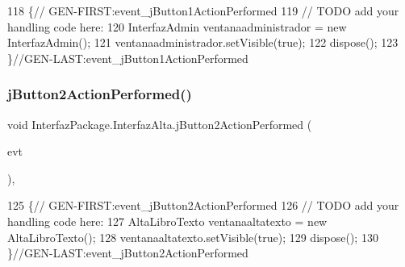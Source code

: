 \begin{DoxyCode}
118                                                                          \{\textcolor{comment}{//
      GEN-FIRST:event\_jButton1ActionPerformed}
119         \textcolor{comment}{// TODO add your handling code here:}
120         InterfazAdmin ventanaadministrador = \textcolor{keyword}{new} InterfazAdmin();
121         ventanaadministrador.setVisible(\textcolor{keyword}{true});
122         dispose();
123     \}\textcolor{comment}{//GEN-LAST:event\_jButton1ActionPerformed}
\end{DoxyCode}
\mbox{\label{class_interfaz_package_1_1_interfaz_alta_ae07fdac3530bdd87b8a2c9ca7705ea61}} 
\subsubsection{\texorpdfstring{j\+Button2\+Action\+Performed()}{jButton2ActionPerformed()}}
{\footnotesize\ttfamily void Interfaz\+Package.\+Interfaz\+Alta.\+j\+Button2\+Action\+Performed (\begin{DoxyParamCaption}\item[{java.\+awt.\+event.\+Action\+Event}]{evt }\end{DoxyParamCaption})\hspace{0.3cm}{\ttfamily [inline]}, {\ttfamily [private]}}


\begin{DoxyCode}
125                                                                          \{\textcolor{comment}{//
      GEN-FIRST:event\_jButton2ActionPerformed}
126         \textcolor{comment}{// TODO add your handling code here:}
127         AltaLibroTexto ventanaaltatexto = \textcolor{keyword}{new} AltaLibroTexto();
128         ventanaaltatexto.setVisible(\textcolor{keyword}{true});
129         dispose();
130     \}\textcolor{comment}{//GEN-LAST:event\_jButton2ActionPerformed}
\end{DoxyCode}
\mbox{\label{class_interfaz_package_1_1_interfaz_alta_a2f5ffffe991863a26854f54c1f62dbad}} 
